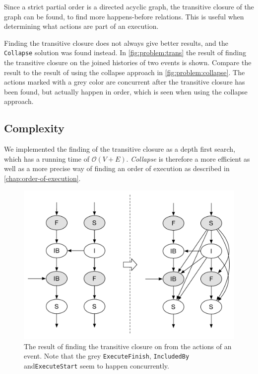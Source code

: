 	Since a strict partial order is a directed acyclic graph, the transitive closure of the graph can be found, to find more happens-before relations. This is useful when determining what actions are part of an execution. 
	
	Finding the transitive closure does not always give better results, and the \texttt{Collapse} solution was found instead. 
	In \autoref{fig:problem:trans} the result of finding the transitive closure on the joined histories of two events is shown. 
	Compare the result to the result of using the collapse approach in \autoref{fig:problem:collapse}. 
	The actions marked with a grey color are concurrent after the transitive closure has been found, but actually happen in order, which is seen when using the collapse approach. 
	
	\subsection{Complexity}
	We implemented the finding of the transitive closure as a depth first search, which has a running time of $\mathcal{O}(V + E)$. \textit{Collapse} is therefore a more efficient as well as a more precise way of finding an order of execution as described in \autoref{chap:order-of-execution}.
	
	
	\begin{figure}
		\centering
		\includegraphics[width=\textwidth]{7previous/images/trans.pdf}
		\caption{The result of finding the transitive closure on from the actions of an event. Note that the grey \texttt{ExecuteFinish}, \texttt{IncludedBy} and\texttt{ExecuteStart} seem to happen concurrently.}
		\label{fig:problem:trans}
	\end{figure}
	
